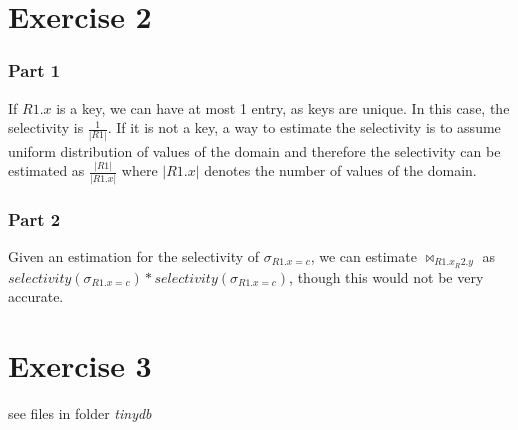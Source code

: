 \documentclass[11pt,a4paper]{scrartcl}
\begin{document}
\section*{Exercise 2}

\subsubsection*{Part 1}

If $R1.x$ is a key, we can have at most 1 entry, as keys are unique. In this case, the selectivity is $\frac{1}{|R1|}$. If it is not a key, a way to estimate the selectivity is to assume uniform distribution of values of the domain and therefore the selectivity can be estimated as $\frac{|R1|}{|R1.x|}$ where $|R1.x|$ denotes the number of values of the domain.

\subsubsection*{Part 2}

Given an estimation for the selectivity of $\sigma_{R1.x=c}$, we can estimate $\Join_{R1.x_R2.y}$ as $selectivity(\sigma_{R1.x=c})*selectivity(\sigma_{R1.x=c})$, though this would not be very accurate.

\section*{Exercise 3}

see files in folder \textit{tinydb}
\end{document}
